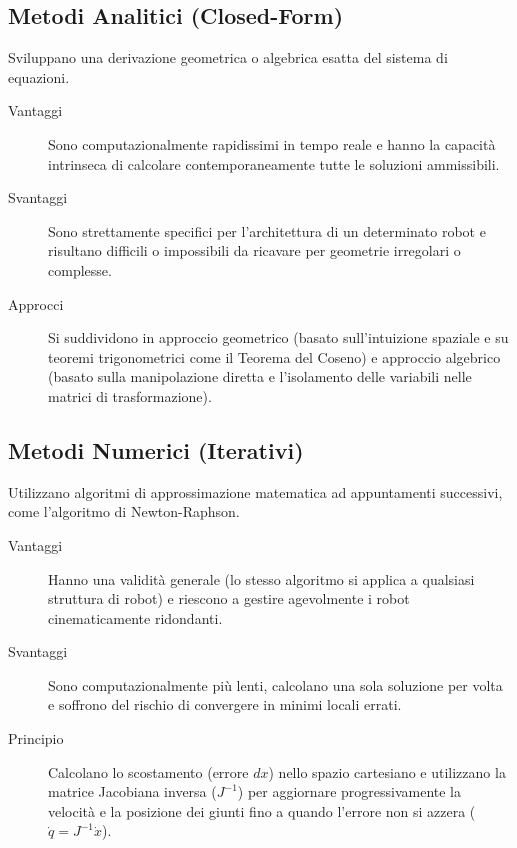 \subsection{Metodi Analitici (Closed-Form)}
Sviluppano una derivazione geometrica o algebrica esatta del sistema di equazioni.
\begin{description}
    \item [Vantaggi] Sono computazionalmente rapidissimi in tempo reale e hanno la capacità intrinseca di calcolare contemporaneamente tutte le soluzioni ammissibili.
    \item [Svantaggi] Sono strettamente specifici per l'architettura di un determinato robot e risultano difficili o impossibili da ricavare per geometrie irregolari o complesse.
    \item [Approcci] Si suddividono in approccio geometrico (basato sull'intuizione spaziale e su teoremi trigonometrici come il Teorema del Coseno) e approccio algebrico (basato sulla manipolazione diretta e l'isolamento delle variabili nelle matrici di trasformazione).
\end{description}

%
\subsection{Metodi Numerici (Iterativi)}
Utilizzano algoritmi di approssimazione matematica ad appuntamenti successivi, come l'algoritmo di Newton-Raphson.
\begin{description}
    \item [Vantaggi] Hanno una validità generale (lo stesso algoritmo si applica a qualsiasi struttura di robot) e riescono a gestire agevolmente i robot cinematicamente ridondanti.
    \item [Svantaggi] Sono computazionalmente più lenti, calcolano una sola soluzione per volta e soffrono del rischio di convergere in minimi locali errati.
    \item [Principio] Calcolano lo scostamento (errore $dx$) nello spazio cartesiano e utilizzano la matrice Jacobiana inversa ($J^{-1}$) per aggiornare progressivamente la velocità e la posizione dei giunti fino a quando l'errore non si azzera ($\dot{q}=J^{-1}\dot{x}$).
\end{description}

%
